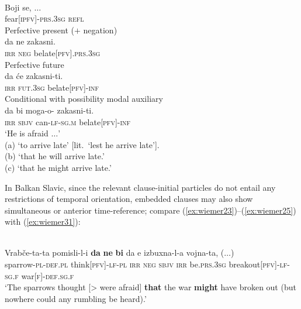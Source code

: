 \documentclass[output=paper,colorlinks,citecolor=brown]{langscibook}
\begin{document}
\ea 
\label{ex:wiemer30}
 \\
\gll Boji se, $\ldots$ \\
fear\textsc{[ipfv]-prs.3sg} \textsc{refl} \\
\ea \label{ex:wiemer30a} \textnormal{Perfective present ($+$ negation)} \\
\gll da ne zakasni. \\
\textsc{irr} \textsc{neg} be\textunderscore late\textsc{[pfv].prs.3sg} \\
\ex \label{ex:wiemer30b} \textnormal{Perfective future} \\
\gll da će zakasni-ti. \\
\textsc{irr} \textsc{fut.3sg} be\textunderscore late\textsc{[pfv]-inf} \\
\ex \label{ex:wiemer30c} \textnormal{Conditional with possibility modal auxiliary} \\
\gll da bi moga-o-\emptyset {} zakasni-ti. \\
\textsc{irr} \textsc{sbjv} can-\textsc{lf-sg.m} be\textunderscore late\textsc{[pfv]-inf} \\
\glt `He is afraid $\ldots$' \\
(a) `to arrive late' [lit.\ `lest he arrive late']. \\
(b) `that he will arrive late.' \\
(c)	`that he might arrive late.'
\z
\z

 In Balkan Slavic, since the relevant clause-initial particles do not entail any restrictions of temporal orientation, embedded clauses may also show simultaneous or anterior time-reference; compare (\ref{ex:wiemer23})--(\ref{ex:wiemer25}) with (\ref{ex:wiemer31}):


\ea
\label{ex:wiemer31} 
 \\
\gll Vrabče-ta-ta pomisli-l-i \textbf{da} \textbf{ne} \textbf{bi} da e izbuxna-l-a vojna-ta, \textnormal{($\ldots$)}\\
sparrow-\textsc{pl-def.pl} think\textsc{[pfv]-lf-pl} \textsc{irr} \textsc{neg} \textsc{sbjv} \textsc{irr} be.\textsc{prs.3sg} break\textunderscore out\textsc{[pfv]-lf-sg.f} war\textsc{[f]-def.sg.f} \\
\glt `The sparrows thought [> were afraid] \textbf{that} the war \textbf{might} have broken out (but nowhere could any rumbling be heard).' \\
\z
\end{document}
